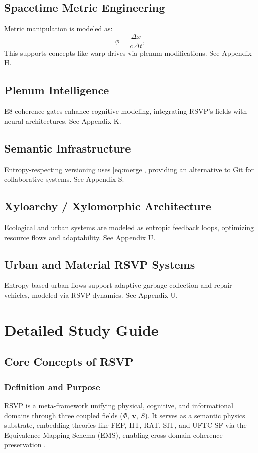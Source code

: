 \documentclass[12pt]{report}
\newcommand{\PhiRSVP}{\Phi}
\newcommand{\vRSVP}{\mathbf{v}}
\newcommand{\SRSVP}{S}
\begin{document}
\chapter{Spacetime Metric Engineering}
Metric manipulation is modeled as:
\begin{equation}
\phi = \frac{\Delta x}{c \, \Delta t}, \label{eq:photon}
\end{equation}
This supports concepts like warp drives via plenum modifications. See Appendix H.

\chapter{Plenum Intelligence}
E8 coherence gates enhance cognitive modeling, integrating RSVP’s fields with neural architectures. See Appendix K.

\chapter{Semantic Infrastructure}
Entropy-respecting versioning uses \eqref{eq:merge}, providing an alternative to Git for collaborative systems. See Appendix S.

\chapter{Xyloarchy / Xylomorphic Architecture}
Ecological and urban systems are modeled as entropic feedback loops, optimizing resource flows and adaptability. See Appendix U.

\chapter{Urban and Material RSVP Systems}
Entropy-based urban flows support adaptive garbage collection and repair vehicles, modeled via RSVP dynamics. See Appendix U.

\part{Detailed Study Guide}

\chapter{Core Concepts of RSVP}
\section{Definition and Purpose}
RSVP is a meta-framework unifying physical, cognitive, and informational domains through three coupled fields (\(\PhiRSVP\), \(\vRSVP\), \(\SRSVP\)). It serves as a semantic physics substrate, embedding theories like FEP, IIT, RAT, SIT, and UFTC-SF via the Equivalence Mapping Schema (EMS), enabling cross-domain coherence preservation \citep{RSVPMeta2025}.
\end{document}
